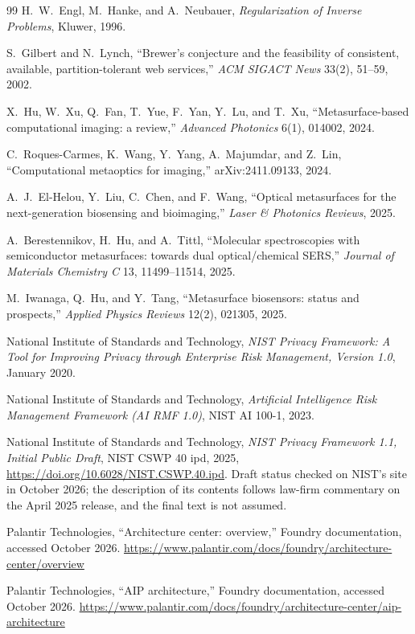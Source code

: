 \documentclass[11pt]{article}
\theoremstyle{plain}
\theoremstyle{definition}
\theoremstyle{remark}
\begin{document}
\begin{thebibliography}{99}
 H.~W.~Engl, M.~Hanke, and A.~Neubauer, \emph{Regularization of Inverse Problems}, Kluwer, 1996.

 S.~Gilbert and N.~Lynch, ``Brewer's conjecture and the feasibility of consistent, available, partition-tolerant web services,'' \emph{ACM SIGACT News} 33(2), 51--59, 2002.

 X.~Hu, W.~Xu, Q.~Fan, T.~Yue, F.~Yan, Y.~Lu, and T.~Xu, ``Metasurface-based computational imaging: a review,'' \emph{Advanced Photonics} 6(1), 014002, 2024.

 C.~Roques-Carmes, K.~Wang, Y.~Yang, A.~Majumdar, and Z.~Lin, ``Computational metaoptics for imaging,'' arXiv:2411.09133, 2024.

 A.~J.~El-Helou, Y.~Liu, C.~Chen, and F.~Wang, ``Optical metasurfaces for the next-generation biosensing and bioimaging,'' \emph{Laser \& Photonics Reviews}, 2025.

 A.~Berestennikov, H.~Hu, and A.~Tittl, ``Molecular spectroscopies with semiconductor metasurfaces: towards dual optical/chemical SERS,'' \emph{Journal of Materials Chemistry C} 13, 11499--11514, 2025.

 M.~Iwanaga, Q.~Hu, and Y.~Tang, ``Metasurface biosensors: status and prospects,'' \emph{Applied Physics Reviews} 12(2), 021305, 2025.

 National Institute of Standards and Technology, \emph{NIST Privacy Framework: A Tool for Improving Privacy through Enterprise Risk Management, Version 1.0}, January 2020.

 National Institute of Standards and Technology, \emph{Artificial Intelligence Risk Management Framework (AI RMF 1.0)}, NIST AI 100-1, 2023.

 National Institute of Standards and Technology, \emph{NIST Privacy Framework 1.1, Initial Public Draft}, NIST CSWP 40 ipd, 2025, \url{https://doi.org/10.6028/NIST.CSWP.40.ipd}. Draft status checked on NIST's site in October 2026; the description of its contents follows law-firm commentary on the April 2025 release, and the final text is not assumed.

 Palantir Technologies, ``Architecture center: overview,'' Foundry documentation, accessed October 2026. \url{https://www.palantir.com/docs/foundry/architecture-center/overview}

 Palantir Technologies, ``AIP architecture,'' Foundry documentation, accessed October 2026. \url{https://www.palantir.com/docs/foundry/architecture-center/aip-architecture}


\end{thebibliography}
\end{document}
